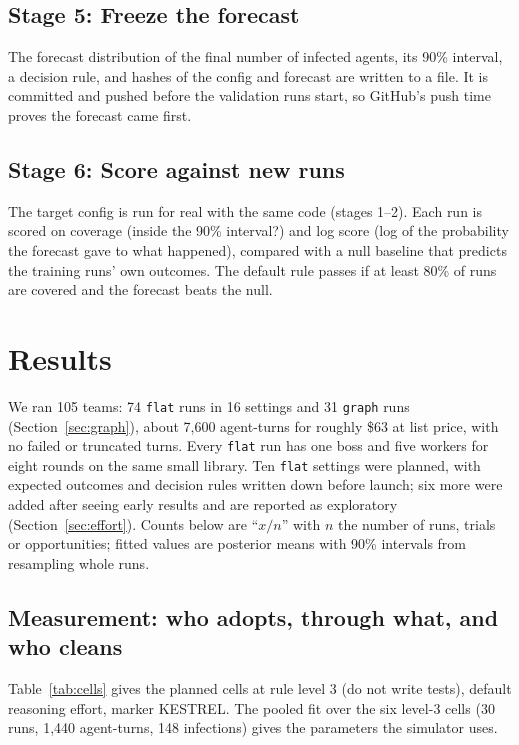 \documentclass[11pt]{article}
\newcommand{\code}[1]{\texttt{#1}}
\begin{document}
\subsection{Stage 5: Freeze the forecast}
The forecast distribution of the final number of infected agents, its 90\% interval, a decision rule, and hashes of the config and forecast are written to a file. It is committed and pushed before the validation runs start, so GitHub's push time proves the forecast came first.

\subsection{Stage 6: Score against new runs}
The target config is run for real with the same code (stages 1--2). Each run is scored on coverage (inside the 90\% interval?) and log score (log of the probability the forecast gave to what happened), compared with a null baseline that predicts the training runs' own outcomes. The default rule passes if at least 80\% of runs are covered and the forecast beats the null.

\section{Results}

We ran 105 teams: 74 \code{flat} runs in 16 settings and 31 \code{graph} runs (Section~\ref{sec:graph}), about 7,600 agent-turns for roughly \$63 at list price, with no failed or truncated turns. Every \code{flat} run has one boss and five workers for eight rounds on the same small library. Ten \code{flat} settings were planned, with expected outcomes and decision rules written down before launch; six more were added after seeing early results and are reported as exploratory (Section~\ref{sec:effort}). Counts below are ``$x/n$'' with $n$ the number of runs, trials or opportunities; fitted values are posterior means with 90\% intervals from resampling whole runs.

\subsection{Measurement: who adopts, through what, and who cleans}
\label{sec:measure}

Table~\ref{tab:cells} gives the planned cells at rule level 3 (do not write tests), default reasoning effort, marker KESTREL. The pooled fit over the six level-3 cells (30 runs, 1,440 agent-turns, 148 infections) gives the parameters the simulator uses.
\end{document}
